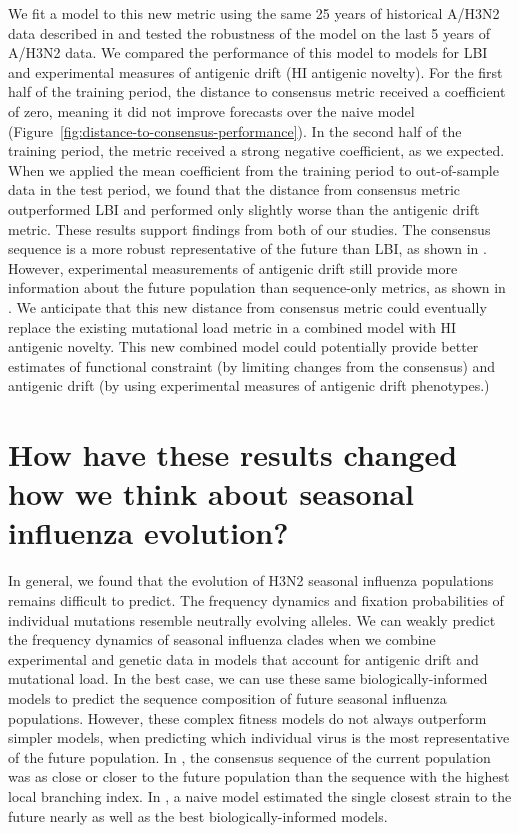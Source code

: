 We fit a model to this new metric using the same 25 years of historical A/H3N2 data described in \citet{Huddleston2020} and tested the robustness of the model on the last 5 years of A/H3N2 data.
We compared the performance of this model to models for LBI and experimental measures of antigenic drift (HI antigenic novelty).
For the first half of the training period, the distance to consensus metric received a coefficient of zero, meaning it did not improve forecasts over the naive model (Figure~\ref{fig:distance-to-consensus-performance}).
In the second half of the training period, the metric received a strong negative coefficient, as we expected.
When we applied the mean coefficient from the training period to out-of-sample data in the test period, we found that the distance from consensus metric outperformed LBI and performed only slightly worse than the antigenic drift metric.
These results support findings from both of our studies.
The consensus sequence is a more robust representative of the future than LBI, as shown in \citet{Barrat-Charlaix2020}.
However, experimental measurements of antigenic drift still provide more information about the future population than sequence-only metrics, as shown in \citet{Huddleston2020}.
We anticipate that this new distance from consensus metric could eventually replace the existing mutational load metric in a combined model with HI antigenic novelty.
This new combined model could potentially provide better estimates of functional constraint (by limiting changes from the consensus) and antigenic drift (by using experimental measures of antigenic drift phenotypes.)

\section{How have these results changed how we think about seasonal influenza evolution?}

In general, we found that the evolution of H3N2 seasonal influenza populations remains difficult to predict.
The frequency dynamics and fixation probabilities of individual mutations resemble neutrally evolving alleles.
We can weakly predict the frequency dynamics of seasonal influenza clades when we combine experimental and genetic data in models that account for antigenic drift and mutational load.
In the best case, we can use these same biologically-informed models to predict the sequence composition of future seasonal influenza populations.
However, these complex fitness models do not always outperform simpler models, when predicting which individual virus is the most representative of the future population.
In \citet{Barrat-Charlaix2020}, the consensus sequence of the current population was as close or closer to the future population than the sequence with the highest local branching index.
In \citet{Huddleston2020}, a naive model estimated the single closest strain to the future nearly as well as the best biologically-informed models.

